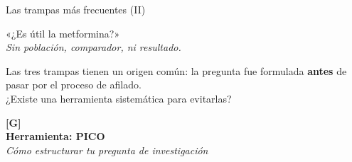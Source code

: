 \documentclass[12pt, aspectratio=169]{beamer}
\begin{document}
\begin{frame}{Las trampas más frecuentes (II)}
  \begin{warningbox}
    \small
    «¿Es útil la metformina?»\\
    \textit{Sin población, comparador, ni resultado.}
  \end{warningbox}

  \medskip
  \begin{keybox}
    \small
    Las tres trampas tienen un origen común: la pregunta fue formulada
    \textbf{antes} de pasar por el proceso de afilado.\\[4pt]
    ¿Existe una herramienta sistemática para evitarlas?
  \end{keybox}
\end{frame}

\begin{frame}[plain]
  \vfill
  \centering
  \begin{tcolorbox}[colback=sfPrimary, colframe=sfPrimary,
                    width=0.72\textwidth, arc=4pt, boxrule=0pt,
                    left=12pt, right=12pt, top=10pt, bottom=10pt]
    \centering
    \color{white}
    \large\textbf{[G]}\\[4pt]
    \Large\textbf{Herramienta: PICO}\\[8pt]
    \normalsize\textit{Cómo estructurar tu pregunta de investigación}
  \end{tcolorbox}
  \vfill
\end{frame}

\end{document}
